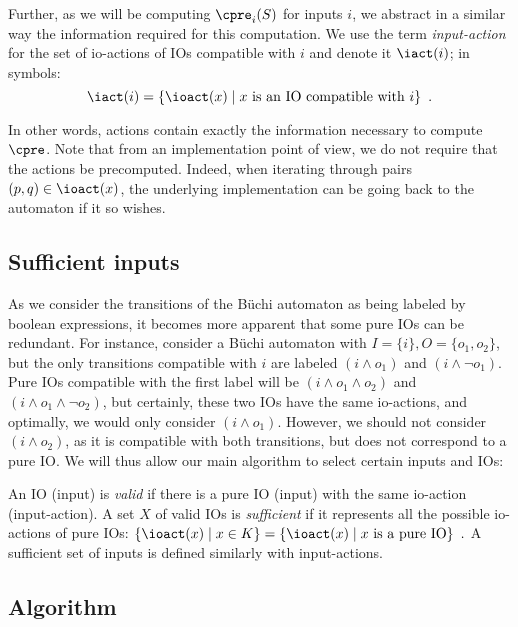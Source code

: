 \documentclass[sigconf,screen,nonacm]{acmart}
\begin{document}
Further, as we will be computing \(\cpre_i(S)\) for inputs \(i\), we abstract in a
similar way the information required for this computation.  We use the term
\emph{input-action} for the set of io-actions of IOs compatible with \(i\) and denote
it \(\iact(i)\); in symbols:
\[\iact(i) = \{\ioact(x) \mid x \text{ is an IO compatible with } i\}\enspace.\]

In other words, actions contain exactly the information necessary to compute
\(\cpre\).  Note that from an implementation point of view, we do not require that
the actions be precomputed.  Indeed, when iterating through pairs
\((p, q) \in \ioact(x)\), the underlying implementation can be going back to the
automaton if it so wishes.

\subsection{Sufficient inputs}\label{sec:sufficient}

As we consider the transitions of the Büchi automaton as being labeled by
boolean expressions, it becomes more apparent that some pure IOs can be
redundant.  For instance, consider a Büchi automaton with
\(I = \{i\}, O = \{o_1, o_2\}\), but the only transitions compatible with \(i\) are
labeled \((i \land o_1)\) and \((i \land \neg o_1)\).  Pure IOs compatible with the first
label will be \((i \land o_1 \land o_2)\) and \((i \land o_1 \land \neg o_2)\), but
certainly, these two IOs have the same io-actions, and optimally, we would only
consider \((i \land o_1)\).  However, we should not consider \((i \land o_2)\), as it is
compatible with both transitions, but does not correspond to a pure IO.  We will
thus allow our main algorithm to select certain inputs and IOs:
\begin{definition}
  An IO (\resp input) is \emph{valid} if there is a pure IO (\resp input) with
  the same io-action (\resp input-action).  A set \(X\) of valid IOs is
  \emph{sufficient} if it represents all the possible io-actions of pure IOs:
\(\{\ioact(x) \mid x \in K\} = \{\ioact(x) \mid x \text{ is a pure
IO}\}\enspace.\)
  A sufficient set of inputs is defined similarly with input-actions.
\end{definition}

\subsection{Algorithm}\label{sec:algo}
\end{document}
